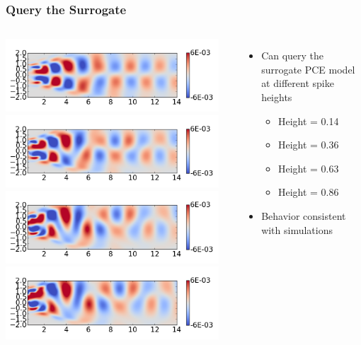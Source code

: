 \documentclass[9pt]{beamer}
\begin{document}
\begin{frame}
\frametitle{Query the Surrogate}
\label{sec-3-3}

\begin{columns}[c]
\centering
\includegraphics[width=0.95\textwidth]{POD2CompareInterp1} \\
\includegraphics[width=0.95\textwidth]{POD2CompareInterp2} \\
\includegraphics[width=0.95\textwidth]{POD2CompareInterp3} \\
\includegraphics[width=0.95\textwidth]{POD2CompareInterp4}
\centering
\begin{itemize}
 \item{Can query the surrogate PCE model at different spike heights}
 \begin{itemize}
   \item{Height = 0.14}
   \item{Height = 0.36}
   \item{Height = 0.63}
   \item{Height = 0.86}
 \end{itemize}
 \item{Behavior consistent with simulations}
\end{itemize}
\end{columns}
\end{frame}
\end{document}
